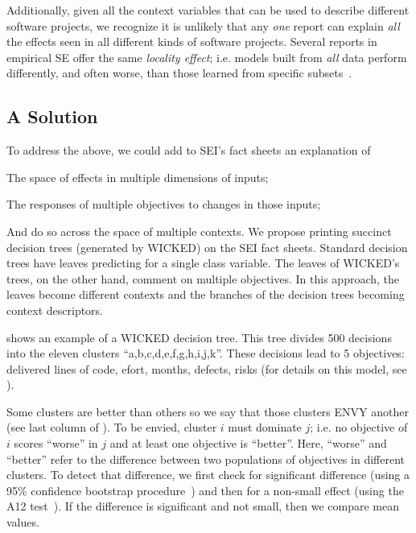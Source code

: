  
Additionally, given all the context variables that can be used to describe different
software projects, we recognize it is unlikely that any 
{\em one} report can explain {\em all} the effects
seen in all different kinds of software projects. Several reports in empirical
SE offer the same {\em locality effect}; i.e. models built from  {\em all}  data perform
differently, and often worse, than those learned from specific subsets~\cite{posnet11,betta12,me12d,yang13,emse12}.

\subsection{A Solution}

To address the above, we could add to SEI's fact sheets an explanation of
\bi
\item
The space of effects in multiple dimensions of inputs;
\item
The responses of multiple objectives to changes in those inputs;
\item
And do so across the space of multiple contexts.
\ei
We propose printing succinct decision trees (generated by WICKED)
on the SEI fact sheets. Standard decision trees have leaves
predicting for a single class variable. The leaves of WICKED's trees, on the other hand,
comment on multiple objectives. In this approach, the leaves become different contexts
and the branches of the decision trees becoming context descriptors.

 shows an example of a WICKED decision tree. This tree
divides 500 decisions into the eleven clusters
``a,b,c,d,e,f,g,h,i,j,k''.  These decisions lead to
5 objectives: delivered lines of code, efort,
months, defects, risks (for details on  this
model, see ).
  
Some clusters
are better than others
so we say that those
clusters ENVY another (see last column
of ).
To be envied, cluster $i$ must dominate $j$; i.e. no objective of $i$ scores ``worse'' in $j$ and at
least one objective is ``better''. Here, ``worse'' and ``better'' refer to the difference
between two populations of objectives in different clusters. To detect that difference, 
we first check for significant difference (using a 95\% confidence bootstrap procedure~\cite{efron93})
and then for a non-small effect (using the A12 test~\cite{Vargha00}). If the difference is significant
and not small, then we compare mean values.

